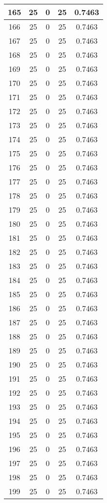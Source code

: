 \documentclass[letterpaper, 12pt]{article}
\begin{document}
\begin{longtable}{|c|c|c|c|c|}
\hline
165 & 25 & 0 & 25 & 0.7463 \\
\hline
166 & 25 & 0 & 25 & 0.7463 \\
\hline
167 & 25 & 0 & 25 & 0.7463 \\
\hline
168 & 25 & 0 & 25 & 0.7463 \\
\hline
169 & 25 & 0 & 25 & 0.7463 \\
\hline
170 & 25 & 0 & 25 & 0.7463 \\
\hline
171 & 25 & 0 & 25 & 0.7463 \\
\hline
172 & 25 & 0 & 25 & 0.7463 \\
\hline
173 & 25 & 0 & 25 & 0.7463 \\
\hline
174 & 25 & 0 & 25 & 0.7463 \\
\hline
175 & 25 & 0 & 25 & 0.7463 \\
\hline
176 & 25 & 0 & 25 & 0.7463 \\
\hline
177 & 25 & 0 & 25 & 0.7463 \\
\hline
178 & 25 & 0 & 25 & 0.7463 \\
\hline
179 & 25 & 0 & 25 & 0.7463 \\
\hline
180 & 25 & 0 & 25 & 0.7463 \\
\hline
181 & 25 & 0 & 25 & 0.7463 \\
\hline
182 & 25 & 0 & 25 & 0.7463 \\
\hline
183 & 25 & 0 & 25 & 0.7463 \\
\hline
184 & 25 & 0 & 25 & 0.7463 \\
\hline
185 & 25 & 0 & 25 & 0.7463 \\
\hline
186 & 25 & 0 & 25 & 0.7463 \\
\hline
187 & 25 & 0 & 25 & 0.7463 \\
\hline
188 & 25 & 0 & 25 & 0.7463 \\
\hline
189 & 25 & 0 & 25 & 0.7463 \\
\hline
190 & 25 & 0 & 25 & 0.7463 \\
\hline
191 & 25 & 0 & 25 & 0.7463 \\
\hline
192 & 25 & 0 & 25 & 0.7463 \\
\hline
193 & 25 & 0 & 25 & 0.7463 \\
\hline
194 & 25 & 0 & 25 & 0.7463 \\
\hline
195 & 25 & 0 & 25 & 0.7463 \\
\hline
196 & 25 & 0 & 25 & 0.7463 \\
\hline
197 & 25 & 0 & 25 & 0.7463 \\
\hline
198 & 25 & 0 & 25 & 0.7463 \\
\hline
199 & 25 & 0 & 25 & 0.7463 \\
\hline
\end{longtable}
\end{document}
